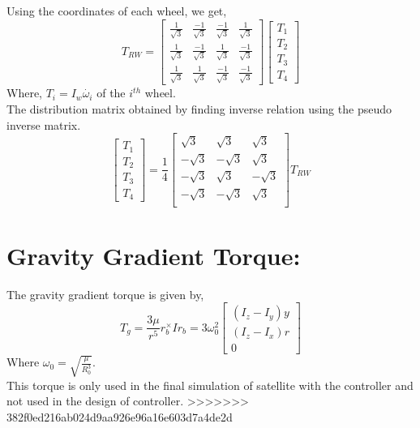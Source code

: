 \documentclass[10pt,a4paper]{report}
\begin{document}
Using the coordinates of each wheel, we get,
\begin{equation}
T_{RW}=\begin{bmatrix}
\frac{1}{\sqrt{3}} &\frac{-1}{\sqrt{3}}&\frac{-1}{\sqrt{3}}&\frac{1}{\sqrt{3}} \\
\frac{1}{\sqrt{3}} &\frac{-1}{\sqrt{3}}&\frac{1}{\sqrt{3}}&\frac{-1}{\sqrt{3}} \\
\frac{1}{\sqrt{3}} &\frac{1}{\sqrt{3}}&\frac{-1}{\sqrt{3}}&\frac{-1}{\sqrt{3}} 
\end{bmatrix}
\begin{bmatrix}
T_{1}\\T_{2}\\T_{3}\\T_{4}
\end{bmatrix}
\end{equation}
Where, $ T_{i}=I_{w}\dot{\omega_{i}} $ of the $ i^{th} $ wheel.
\\The distribution matrix obtained by finding inverse relation using the pseudo inverse matrix.
\begin{equation}
\begin{bmatrix}
T_{1}\\T_{2}\\T_{3}\\T_{4}
\end{bmatrix}
=\frac{1}{4}\begin{bmatrix}
\sqrt{3}&\sqrt{3}&\sqrt{3}\\
-\sqrt{3}&-\sqrt{3}&\sqrt{3}\\
-\sqrt{3}&\sqrt{3}&-\sqrt{3}\\
-\sqrt{3}&-\sqrt{3}&\sqrt{3}\\
\end{bmatrix}
T_{RW}
\end{equation}

\section{Gravity Gradient Torque:}
The gravity gradient torque is given by,
	\begin{equation}
	T_{g}=\frac{3\mu}{r^{5}}r_{b}^{\times}Ir_{b}=3\omega_{0}^{2}\begin{bmatrix}
	(I_{z}-I_{y})y\\(I_{z}-I_{x})r \\0
	\end{bmatrix}
	\end{equation}
	Where $ \omega_{0} =\sqrt{\frac{\mu}{R_{0}^{3}}}$.\\
This torque is only used in the final simulation of satellite with the controller and not used in the design of controller.
>>>>>>> 382f0ed216ab024d9aa926e96a16e603d7a4de2d
\end{document}
